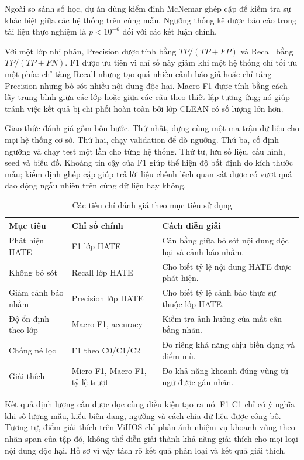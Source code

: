 \documentclass[12pt,a4paper]{article}
\begin{document}
Ngoài so sánh số học, dự án dùng kiểm định McNemar ghép cặp để kiểm tra sự khác biệt giữa các hệ thống trên cùng mẫu. Ngưỡng thống kê được báo cáo trong tài liệu thực nghiệm là $p<10^{-6}$ đối với các kết luận chính.

Với một lớp nhị phân, Precision được tính bằng $TP/(TP+FP)$ và Recall bằng $TP/(TP+FN)$. F1 được ưu tiên vì chỉ số này giảm khi một hệ thống chỉ tối ưu một phía: chỉ tăng Recall nhưng tạo quá nhiều cảnh báo giả hoặc chỉ tăng Precision nhưng bỏ sót nhiều nội dung độc hại. Macro F1 được tính bằng cách lấy trung bình giữa các lớp hoặc giữa các câu theo thiết lập tương ứng; nó giúp tránh việc kết quả bị chi phối hoàn toàn bởi lớp CLEAN có số lượng lớn hơn.

Giao thức đánh giá gồm bốn bước. Thứ nhất, dựng cùng một ma trận dữ liệu cho mọi hệ thống cơ sở. Thứ hai, chạy validation để dò ngưỡng. Thứ ba, cố định ngưỡng và chạy test một lần cho từng hệ thống. Thứ tư, lưu số liệu, cấu hình, seed và biểu đồ. Khoảng tin cậy của F1 giúp thể hiện độ bất định do kích thước mẫu; kiểm định ghép cặp giúp trả lời liệu chênh lệch quan sát được có vượt quá dao động ngẫu nhiên trên cùng dữ liệu hay không.

\begin{table}[H]
\centering
\caption{Các tiêu chí đánh giá theo mục tiêu sử dụng}
\label{tab:evaluation-criteria}
\begin{tabularx}{\textwidth}{p{}p{}p{}}
\toprule
\textbf{Mục tiêu} & \textbf{Chỉ số chính} & \textbf{Cách diễn giải}\\
\midrule
Phát hiện HATE & F1 lớp HATE & Cân bằng giữa bỏ sót nội dung độc hại và cảnh báo nhầm.\\
Không bỏ sót & Recall lớp HATE & Cho biết tỷ lệ nội dung HATE được phát hiện.\\
Giảm cảnh báo nhầm & Precision lớp HATE & Cho biết tỷ lệ cảnh báo thực sự thuộc lớp HATE.\\
Độ ổn định theo lớp & Macro F1, accuracy & Kiểm tra ảnh hưởng của mất cân bằng nhãn.\\
Chống né lọc & F1 theo C0/C1/C2 & Đo riêng khả năng chịu biến dạng và điểm mù.\\
Giải thích & Micro F1, Macro F1, tỷ lệ trượt & Đo khả năng khoanh đúng vùng từ ngữ được gán nhãn.\\
\bottomrule
\end{tabularx}
\end{table}

Kết quả định lượng cần được đọc cùng điều kiện tạo ra nó. F1 C1 chỉ có ý nghĩa khi số lượng mẫu, kiểu biến dạng, ngưỡng và cách chia dữ liệu được công bố. Tương tự, điểm giải thích trên ViHOS chỉ phản ánh nhiệm vụ khoanh vùng theo nhãn span của tập đó, không thể diễn giải thành khả năng giải thích cho mọi loại nội dung độc hại. Hồ sơ vì vậy tách rõ kết quả phân loại và kết quả giải thích.
\end{document}

